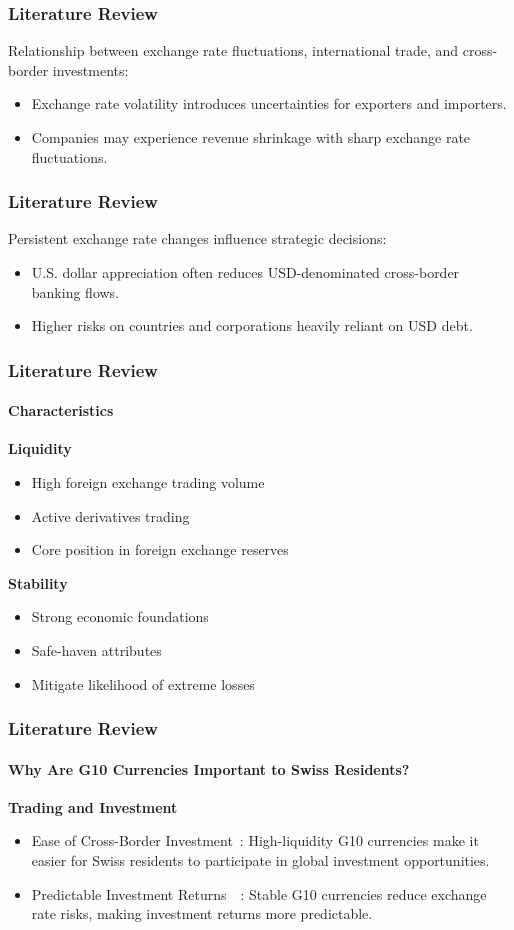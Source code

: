 \documentclass[10pt]{beamer}
\begin{document}
\begin{frame}
\frametitle{Literature Review}
Relationship between exchange rate fluctuations, international trade, and cross-border investments:~\cite{AUBOIN_RUTA_2013}
\begin{itemize}
    \item Exchange rate volatility introduces uncertainties for exporters and importers.
    \item Companies may experience revenue shrinkage with sharp exchange rate fluctuations.
\end{itemize}
\end{frame}
\begin{frame}
\frametitle{Literature Review}
Persistent exchange rate changes influence strategic decisions:~\cite{riker2020review}
\begin{itemize}
    \item U.S. dollar appreciation often reduces USD-denominated cross-border banking flows.~\cite{dollar_exchange}
    \item Higher risks on countries and corporations heavily reliant on USD debt.~\cite{dollar_exchange}
\end{itemize}
\end{frame}
\begin{frame}
\frametitle{Literature Review}
\framesubtitle{Characteristics}
\textbf{Liquidity}~\cite{rogoff2000six}
\begin{itemize}
    \item High foreign exchange trading volume
    \item Active derivatives trading
    \item Core position in foreign exchange reserves
\end{itemize}
\textbf{Stability}~\cite{campbell2002strategic}~\cite{engel2016exchange}
\begin{itemize}
    \item Strong economic foundations
    \item Safe-haven attributes
    \item Mitigate likelihood of extreme losses
\end{itemize}
\end{frame}
\begin{frame}
\frametitle{Literature Review}
\framesubtitle{Why Are G10 Currencies Important to Swiss Residents?}
\textbf{Trading and Investment}
\begin{itemize}
    \item Ease of Cross-Border Investment~\cite{rogoff2000six}: High-liquidity G10 currencies make it easier for Swiss residents to participate in global investment opportunities.
    \item Predictable Investment Returns~\cite{campbell2002strategic}~\cite{engel2016exchange}: Stable G10 currencies reduce exchange rate risks, making investment returns more predictable.
\end{itemize}
\end{frame}
\end{document}
